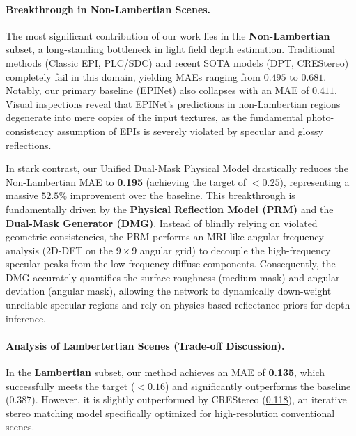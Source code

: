 \documentclass[lettersize,journal]{IEEEtran}
\begin{document}
\paragraph{Breakthrough in Non-Lambertian Scenes.}

The most significant contribution of our work lies in the \textbf{Non-Lambertian} subset, a long-standing bottleneck in light field depth estimation. Traditional methods (Classic EPI, PLC/SDC) and recent SOTA models (DPT, CREStereo) completely fail in this domain, yielding MAEs ranging from $0.495$ to $0.681$. Notably, our primary baseline (EPINet) also collapses with an MAE of $0.411$. Visual inspections reveal that EPINet's predictions in non-Lambertian regions degenerate into mere copies of the input textures, as the fundamental photo-consistency assumption of EPIs is severely violated by specular and glossy reflections.

In stark contrast, our Unified Dual-Mask Physical Model drastically reduces the Non-Lambertian MAE to \textbf{0.195} (achieving the target of $< 0.25$), representing a massive $52.5\%$ improvement over the baseline. This breakthrough is fundamentally driven by the \textbf{Physical Reflection Model (PRM)} and the \textbf{Dual-Mask Generator (DMG)}. Instead of blindly relying on violated geometric consistencies, the PRM performs an MRI-like angular frequency analysis (2D-DFT on the $9 \times 9$ angular grid) to decouple the high-frequency specular peaks from the low-frequency diffuse components. Consequently, the DMG accurately quantifies the surface roughness (medium mask) and angular deviation (angular mask), allowing the network to dynamically down-weight unreliable specular regions and rely on physics-based reflectance priors for depth inference.

\paragraph{Analysis of Lambertertian Scenes (Trade-off Discussion).}

In the \textbf{Lambertian} subset, our method achieves an MAE of \textbf{0.135}, which successfully meets the target ($< 0.16$) and significantly outperforms the baseline ($0.387$). However, it is slightly outperformed by CREStereo (\underline{0.118}), an iterative stereo matching model specifically optimized for high-resolution conventional scenes.
\end{document}
